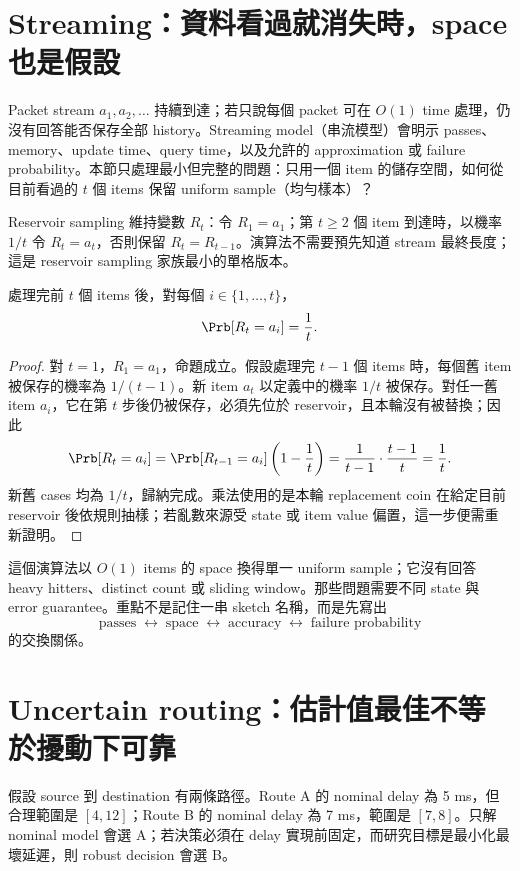 \documentclass[11pt,a4paper,oneside,openany]{book}
\begin{document}
\section{Streaming：資料看過就消失時，space 也是假設}

Packet stream $a_1,a_2,\ldots$ 持續到達；若只說每個 packet 可在 $O(1)$ time 處理，仍沒有回答能否保存全部 history。Streaming model（串流模型）會明示 passes、memory、update time、query time，以及允許的 approximation 或 failure probability。本節只處理最小但完整的問題：只用一個 item 的儲存空間，如何從目前看過的 $t$ 個 items 保留 uniform sample（均勻樣本）？

Reservoir sampling 維持變數 $R_t$：令 $R_1=a_1$；第 $t\ge2$ 個 item 到達時，以機率 $1/t$ 令 $R_t=a_t$，否則保留 $R_t=R_{t-1}$。演算法不需要預先知道 stream 最終長度；這是 reservoir sampling 家族最小的單格版本\cite{vitter-reservoir}。

\begin{theorem}
處理完前 $t$ 個 items 後，對每個 $i\in\{1,\ldots,t\}$，
\[
 \Prb[R_t=a_i]=\frac1t.
\]
\end{theorem}
\begin{proof}
對 $t=1$，$R_1=a_1$，命題成立。假設處理完 $t-1$ 個 items 時，每個舊 item 被保存的機率為 $1/(t-1)$。新 item $a_t$ 以定義中的機率 $1/t$ 被保存。對任一舊 item $a_i$，它在第 $t$ 步後仍被保存，必須先位於 reservoir，且本輪沒有被替換；因此
\[
 \Prb[R_t=a_i]
 =\Prb[R_{t-1}=a_i]\left(1-\frac1t\right)
 =\frac1{t-1}\cdot\frac{t-1}{t}
 =\frac1t.
\]
新舊 cases 均為 $1/t$，歸納完成。乘法使用的是本輪 replacement coin 在給定目前 reservoir 後依規則抽樣；若亂數來源受 state 或 item value 偏置，這一步便需重新證明。
\end{proof}

這個演算法以 $O(1)$ items 的 space 換得單一 uniform sample；它沒有回答 heavy hitters、distinct count 或 sliding window。那些問題需要不同 state 與 error guarantee。重點不是記住一串 sketch 名稱，而是先寫出
\[
 \text{passes}\;\leftrightarrow\;\text{space}\;\leftrightarrow\;
 \text{accuracy}\;\leftrightarrow\;\text{failure probability}
\]
的交換關係。

\section{Uncertain routing：估計值最佳不等於擾動下可靠}

假設 source 到 destination 有兩條路徑。Route A 的 nominal delay 為 5 ms，但合理範圍是 $[4,12]$；Route B 的 nominal delay 為 7 ms，範圍是 $[7,8]$。只解 nominal model 會選 A；若決策必須在 delay 實現前固定，而研究目標是最小化最壞延遲，則 robust decision 會選 B。
\end{document}

